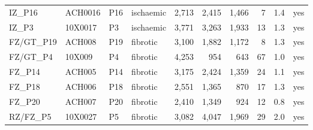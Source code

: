 \begin{longtable}{llllrrrrrc}
IZ\_P16 & ACH0016 & P16 & ischaemic & 2,713 & 2,415 & 1,466 & 7 & 1.4 & yes \\
IZ\_P3 & 10X0017 & P3 & ischaemic & 3,771 & 3,263 & 1,933 & 13 & 1.3 & yes \\
FZ/GT\_P19 & ACH008 & P19 & fibrotic & 3,100 & 1,882 & 1,172 & 8 & 1.3 & yes \\
FZ/GT\_P4 & 10X009 & P4 & fibrotic & 4,253 & 954 & 643 & 67 & 1.0 & yes \\
FZ\_P14 & ACH005 & P14 & fibrotic & 3,175 & 2,424 & 1,359 & 24 & 1.1 & yes \\
FZ\_P18 & ACH006 & P18 & fibrotic & 2,551 & 1,365 & 870 & 17 & 1.3 & yes \\
FZ\_P20 & ACH007 & P20 & fibrotic & 2,410 & 1,349 & 924 & 12 & 0.8 & yes \\
RZ/FZ\_P5 & 10X0027 & P5 & fibrotic & 3,082 & 4,047 & 1,969 & 29 & 2.0 & yes \\
\bottomrule
\end{longtable}
